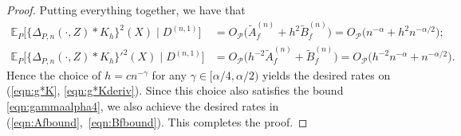\documentclass[aos]{imsart}
\newcommand{\E}{\mathbb{E}}
\begin{document}
\begin{proof}
		Putting everything together, we have that \begin{align*}
		  \E_P\big[\{\Delta_{P,n}(\cdot,Z)*K_h\}^2(X) \;\big|\; D^{(n,1)} \big] &= O_{\mathcal{P}}\big(\tilde{A}_f^{(n)} + h^2 \tilde{B}_f^{(n)}\big) = O_{\mathcal{P}}\big(n^{-\alpha} + h^2 n^{-\alpha/2}\big);\\
			\E_P\big[\{\Delta_{P,n}(\cdot,Z)*K_h\}'^2(X) \;\big|\; D^{(n,1)} \big] &= O_{\mathcal{P}}\big(h^{-2}\tilde{A}_f^{(n)} + \tilde{B}_f^{(n)}\big)= O_{\mathcal{P}}\big(h^{-2} n^{-\alpha} + n^{-\alpha/2}\big). 
		\end{align*}
		Hence the choice of $h = cn^{-\gamma}$ for any $\gamma \in [\alpha/4, \alpha/2)$ yields the desired rates on (\ref{eqn:g*K}, \ref{eqn:g*Kderiv}). Since this choice also satisfies the bound \eqref{eqn:gammaalpha4}, we also achieve the desired rates in (\ref{eqn:Afbound},~\ref{eqn:Bfbound}). This completes the proof.     
	\end{proof}
\end{document}
